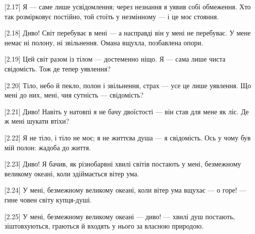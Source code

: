 [2.17] Я --- саме лише усвідомлення; через незнання я уявив собі обмеження. Хто так розмірковує постійно, той стоїть у незмінному --- і це моє стояння.

[2.18] Диво! Світ перебуває в мені --- а насправді він у мені не перебуває. У мене немає ні полону, ні звільнення. Омана вщухла, позбавлена опори.

[2.19] Цей світ разом із тілом --- достеменно ніщо. Я --- сама лише чиста свідомість. Тож де тепер уявлення?

[2.20] Тіло, небо й пекло, полон і звільнення, страх --- усе це лише уявлення. Що мені до них, мені, чия сутність --- свідомість?

[2.21] Диво! Навіть у натовпі я не бачу двоїстості --- він став для мене як ліс. Де ж мені шукати втіхи?

[2.22] Я не тіло, і тіло не моє; я не життєва душа --- я свідомість. Ось у чому був мій полон: жадоба до життя.

[2.23] Диво! Я бачив, як різнобарвні хвилі світів постають у мені, безмежному великому океані, коли здіймається вітер ума.

[2.24] У мені, безмежному великому океані, коли вітер ума вщухає --- о горе! --- гине човен світу купця-душі.

[2.25] У мені, безмежному великому океані --- диво! --- хвилі душ постають, зіштовхуються, граються й входять у нього за власною природою.
